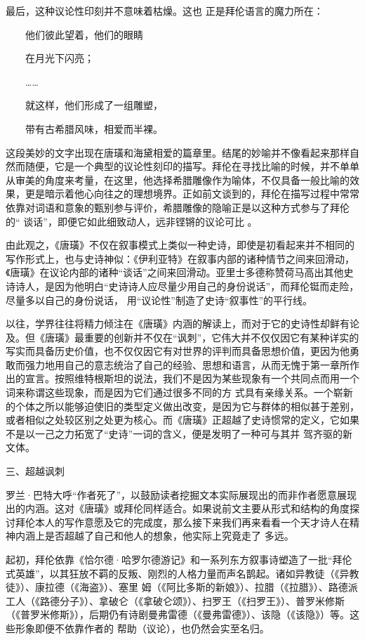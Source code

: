 \documentclass{article}
\begin{document}
\newpage

最后，这种议论性印刻并不意味着枯燥。这也
正是拜伦语言的魔力所在： 


　　他们彼此望着，他们的眼睛 


　　在月光下闪亮； 


　　…… 


　　就这样，他们形成了一组雕塑， 


　　带有古希腊风味，相爱而半裸。 

这段美妙的文字出现在唐璜和海黛相爱的篇章里。结尾的妙喻并不像看起来那样自然而随便，它是一个典型的议论性刻印的描写。拜伦在寻找比喻的时候，并不单单从审美的角度来考量，在这里，他选择希腊雕像作为喻体，不仅具备一般比喻的效果，更是暗示着他心向往之的理想境界。正如前文谈到的，拜伦在描写过程中常常依靠对词语和意象的甄别参与评价，希腊雕像的隐喻正是以这种方式参与了拜伦的“
\newpage
谈话”，即便它如此细致动人，远非铿锵的议论可比
。 

由此观之，《唐璜》不仅在叙事模式上类似一种史诗，即使是初看起来并不相同的写作形式上，也与史诗神似：《伊利亚特》在叙事内部的诸种情节之间来回滑动，《唐璜》在议论内部的诸种“谈话”之间来回滑动。亚里士多德称赞荷马高出其他史诗诗人，是因为他明白“史诗诗人应尽量少用自己的身份说话”，而拜伦铤而走险，尽量多以自己的身份说话，
用“议论性”制造了史诗“叙事性”的平行线。 

以往，学界往往将精力倾注在《唐璜》内涵的解读上，而对于它的史诗性却鲜有论及。但《唐璜》最重要的创新并不仅在“讽刺”，它伟大并不仅仅因它有某种详实的写实而具备历史价值，也不仅仅因它有对世界的评判而具备思想价值，更因为他勇敢而强力地用自己的意志统治了自己的经验、思想和语言，从而无愧于第一章所作出的宣言。按照维特根斯坦的说法，我们不是因为某些现象有一个共同点而用一个词来称谓这些现象，而是因为它们通过很多不同的方
\newpage
式具有亲缘关系。一个崭新的个体之所以能够迫使旧的类型定义做出改变，是因为它与群体的相似甚于差别，或者相似之处较区别之处更为核心。而《唐璜》正超越了史诗惯常的定义，它如果不是以一己之力拓宽了“史诗”一词的含义，便是发明了一种可与其并
驾齐驱的新文体。 


三、超越讽刺 

罗兰·巴特大呼“作者死了”，以鼓励读者挖掘文本实际展现出的而非作者愿意展现出的内涵。这对《唐璜》或拜伦同样适合。如果说前文主要从形式和结构的角度探讨拜伦本人的写作意愿及它的完成度，那么接下来我们再来看看一个天才诗人在精神内涵上是否超越了自己和他人的想象，他实际上究竟走了
多远。 

起初，拜伦依靠《恰尔德·哈罗尔德游记》和一系列东方叙事诗塑造了一批“拜伦式英雄”，以其狂放不羁的反叛、刚烈的人格力量而声名鹊起。诸如异教徒（《异教徒》）、康拉德（《海盗》）、塞里
\newpage
姆（《阿比多斯的新娘》）、拉腊（《拉腊》）、路德派工人（《路德分子》）、拿破仑（《拿破仑颂》）、扫罗王（《扫罗王》）、普罗米修斯（《普罗米修斯》），后期仍有诗剧曼弗雷德（《曼弗雷德》）、该隐（《该隐》）等。这些形象即便不依靠作者的
帮助（议论），也仍然会实至名归。 
\end{document}
